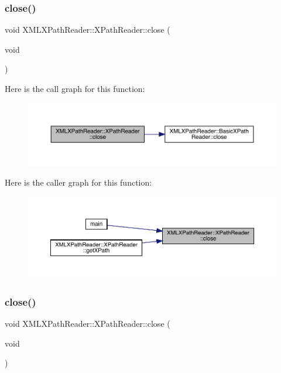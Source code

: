 \subsubsection{\texorpdfstring{close()}{close()}\hspace{0.1cm}{\footnotesize\ttfamily [1/2]}}
{\footnotesize\ttfamily void X\+M\+L\+X\+Path\+Reader\+::\+X\+Path\+Reader\+::close (\begin{DoxyParamCaption}\item[{void}]{ }\end{DoxyParamCaption})\hspace{0.3cm}{\ttfamily [inline]}}

Here is the call graph for this function\+:
\nopagebreak
\begin{figure}[H]
\begin{center}
\leavevmode
\includegraphics[width=350pt]{d3/d5a/classXMLXPathReader_1_1XPathReader_a2b6cfab8c9771da838a2bca6c9f23cb9_cgraph}
\end{center}
\end{figure}
Here is the caller graph for this function\+:\nopagebreak
\begin{figure}[H]
\begin{center}
\leavevmode
\includegraphics[width=350pt]{d3/d5a/classXMLXPathReader_1_1XPathReader_a2b6cfab8c9771da838a2bca6c9f23cb9_icgraph}
\end{center}
\end{figure}
\mbox{\label{classXMLXPathReader_1_1XPathReader_a2b6cfab8c9771da838a2bca6c9f23cb9}} 
\subsubsection{\texorpdfstring{close()}{close()}\hspace{0.1cm}{\footnotesize\ttfamily [2/2]}}
{\footnotesize\ttfamily void X\+M\+L\+X\+Path\+Reader\+::\+X\+Path\+Reader\+::close (\begin{DoxyParamCaption}\item[{void}]{ }\end{DoxyParamCaption})\hspace{0.3cm}{\ttfamily [inline]}}

